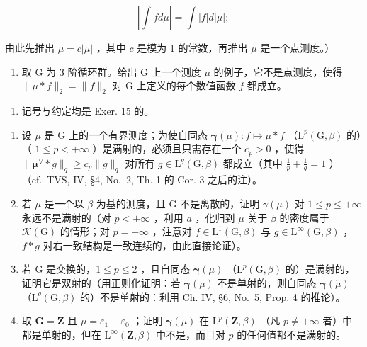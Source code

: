 \[
\left| \int f d \mu \right| = \int | f | d | \mu |;
\]

由此先推出 \(\mu = c|\mu|\) ，其中 \(c\) 是模为 1 的常数，再推出 \(\mu\) 是一个点测度。）

\begin{enumerate}
\def\labelenumi{\alph{enumi})}
\setcounter{enumi}{1}
\tightlist
\item
  取 G 为 3 阶循环群。给出 G 上一个测度 \(\mu\) 的例子，它不是点测度，使得 \(\| \mu * f \|_2 = \| f \|_2\) 对 G 上定义的每个数值函数 \(f\) 都成立。
\end{enumerate}

\begin{enumerate}
\def\labelenumi{\arabic{enumi})}
\setcounter{enumi}{16}
\tightlist
\item
  记号与约定均是 Exer. 15 的。
\end{enumerate}

\begin{enumerate}
\def\labelenumi{\alph{enumi})}
\item
  设 \(\mu\) 是 G 上的一个有界测度；为使自同态 \(\pmb{\gamma}(\mu): f \mapsto \mu * f\) （\(\mathrm{L}^p(\mathrm{G}, \beta)\) 的）（ \(1 \leqslant p < +\infty\) ）是满射的，必须且只需存在一个 \(c_p > 0\) ，使得 \(\| \pmb{\mu}^{\vee} * g \|_q \geqslant c_p \| g \|_q\) 对所有 \(g \in \mathrm{L}^q(\mathrm{G}, \beta)\) 都成立（其中 \(\frac{1}{p} + \frac{1}{q} = 1\) ）（cf.~TVS, IV, §4, No.~2, Th. 1 的 Cor. 3 之后的注）。
\item
  若 \(\mu\) 是一个以 \(\beta\) 为基的测度，且 G 不是离散的，证明 \(\gamma(\mu)\) 对 \(1 \leqslant p \leqslant +\infty\) 永远不是满射的（对 \(p < +\infty\) ，利用 \(a\) ，化归到 \(\mu\) 关于 \(\beta\) 的密度属于 \(\mathcal{K}(\mathrm{G})\) 的情形；对 \(p = +\infty\) ，注意对 \(f \in \mathrm{L}^1(\mathrm{G}, \beta)\) 与 \(g \in \mathrm{L}^\infty(\mathrm{G}, \beta)\) ，\(f * g\) 对右一致结构是一致连续的，由此直接论证）。
\item
  若 G 是交换的，\(1 \leqslant p \leqslant 2\) ，且自同态 \(\pmb{\gamma}(\mu)\) （\(\mathrm{L}^p(\mathrm{G},\beta)\) 的）是满射的，证明它是双射的（用正则化证明：若 \(\pmb{\gamma}(\mu)\) 不是单射的，则自同态 \(\pmb{\gamma}(\check{\mu})\) （\(\mathrm{L}^q(\mathrm{G},\beta)\) 的）不是单射的：利用 Ch. IV, §6, No.~5, Prop. 4 的推论）。
\item
  取 \(\mathbf{G} = \mathbf{Z}\) 且 \(\mu = \varepsilon_1 - \varepsilon_0\) ；证明 \(\pmb{\gamma}(\mu)\) 在 \(\mathrm{L}^p (\mathbf{Z},\beta)\) （凡 \(p\neq +\infty\) 者）中都是单射的，但在 \(\mathrm{L}^{\infty}(\mathbf{Z},\beta)\) 中不是，而且对 \(p\) 的任何值都不是满射的。
\end{enumerate}

